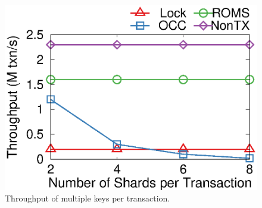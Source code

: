 \begin{figure}[t!]
\begin{minipage}{.31\textwidth}
		\centering
		\includegraphics[width=\textwidth]{gnuplot/multishard.eps}
		\caption{Throughput of multiple keys per transaction.}
		\label{fig:multishard}
    \end{minipage}
	\hspace{0.01\textwidth}
	\begin{minipage}{.31\textwidth}
		\centering
		\vspace{0.01\textwidth}

\end{minipage}
\end{figure}
